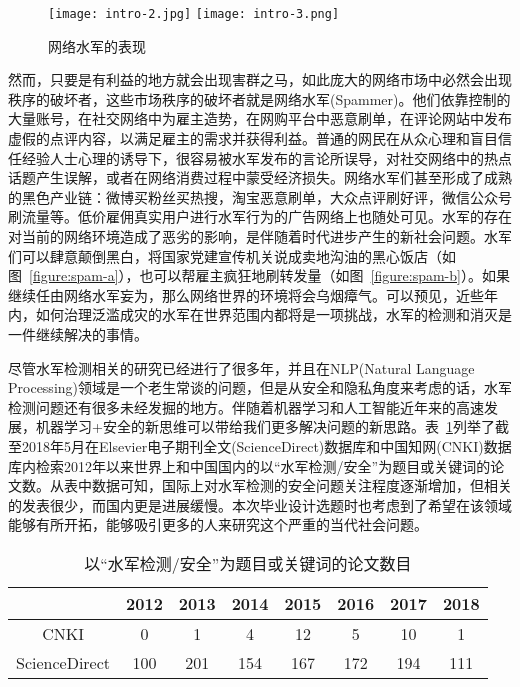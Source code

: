 \begin{figure}[htp]
	\centering
	{\texttt{[image: intro-2.jpg]}}
	\hspace{4em}
	{\texttt{[image: intro-3.png]}}
	\caption[网络水军的表现]{网络水军的表现}
\end{figure}

然而，只要是有利益的地方就会出现害群之马，如此庞大的网络市场中必然会出现秩序的破坏者，这些市场秩序的破坏者就是网络水军(Spammer)。他们依靠控制的大量账号，在社交网络中为雇主造势，在网购平台中恶意刷单，在评论网站中发布虚假的点评内容，以满足雇主的需求并获得利益。普通的网民在从众心理和盲目信任经验人士心理的诱导下，很容易被水军发布的言论所误导，对社交网络中的热点话题产生误解，或者在网络消费过程中蒙受经济损失。网络水军们甚至形成了成熟的黑色产业链：微博买粉丝买热搜，淘宝恶意刷单，大众点评刷好评，微信公众号刷流量等。低价雇佣真实用户进行水军行为的广告网络上也随处可见。水军的存在对当前的网络环境造成了恶劣的影响，是伴随着时代进步产生的新社会问题。水军们可以肆意颠倒黑白，将国家党建宣传机关说成卖地沟油的黑心饭店（如图~\ref{figure:spam-a}），也可以帮雇主疯狂地刷转发量（如图~\ref{figure:spam-b}）。如果继续任由网络水军妄为，那么网络世界的环境将会乌烟瘴气。可以预见，近些年内，如何治理泛滥成灾的水军在世界范围内都将是一项挑战，水军的检测和消灭是一件继续解决的事情。


尽管水军检测相关的研究已经进行了很多年，并且在NLP(Natural Language Processing)领域是一个老生常谈的问题，但是从安全和隐私角度来考虑的话，水军检测问题还有很多未经发掘的地方。伴随着机器学习和人工智能近年来的高速发展，机器学习+安全的新思维可以带给我们更多解决问题的新思路。表~\ref{tbl:intro-1}列举了截至2018年5月在Elsevier电子期刊全文(ScienceDirect)数据库和中国知网(CNKI)数据库内检索2012年以来世界上和中国国内的以“水军检测/安全”为题目或关键词的论文数。从表中数据可知，国际上对水军检测的安全问题关注程度逐渐增加，但相关的发表很少，而国内更是进展缓慢。本次毕业设计选题时也考虑到了希望在该领域能够有所开拓，能够吸引更多的人来研究这个严重的当代社会问题。

\begin{table}[htb]
	\centering
	\caption[以“水军检测/安全”为题目或关键词的论文数目]{以“水军检测/安全”为题目或关键词的论文数目}
	\label{tbl:intro-1}
	\begin{tabular}{c|ccccccc}	
		\toprule
						& 2012 & 2013 & 2014 & 2015 & 2016 & 2017 & 2018 \\
		\midrule
		CNKI 			& 0   & 1   & 4   &	12  & 5   & 10  &   1 \\
		ScienceDirect	& 100 & 201 & 154 &	167 & 172 & 194 & 111 \\
		\bottomrule
	\end{tabular}
\end{table}


